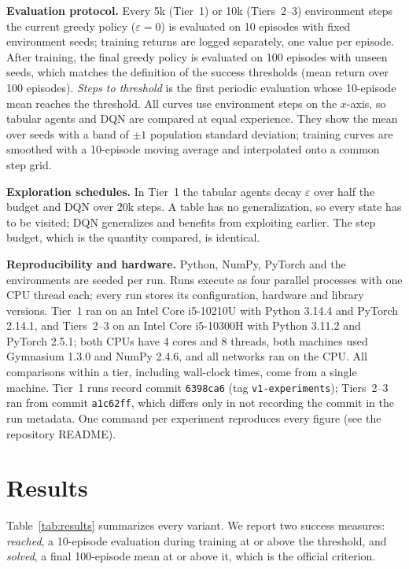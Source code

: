\documentclass[conference]{IEEEtran}
\begin{document}
\textbf{Evaluation protocol.} Every 5k (Tier~1) or 10k (Tiers~2--3) environment steps the
current greedy policy ($\varepsilon=0$) is evaluated on 10 episodes with fixed environment
seeds; training returns are logged separately, one value per episode. After training, the
final greedy policy is evaluated on 100 episodes with unseen seeds, which matches the
definition of the success thresholds (mean return over 100 episodes). \emph{Steps to
threshold} is the first periodic evaluation whose 10-episode mean reaches the threshold.
All curves use environment steps on the $x$-axis, so tabular agents and DQN are compared
at equal experience. They show the mean over seeds with a band of $\pm1$ population standard
deviation; training curves are smoothed with a 10-episode moving average and interpolated
onto a common step grid.

\textbf{Exploration schedules.} In Tier~1 the tabular agents decay $\varepsilon$ over half
the budget and DQN over 20k steps. A table has no generalization, so every state has to be
visited; DQN generalizes and benefits from exploiting earlier. The step budget, which is
the quantity compared, is identical.

\textbf{Reproducibility and hardware.} Python, NumPy, PyTorch and the environments are
seeded per run. Runs execute as four parallel processes with one CPU thread each; every run
stores its configuration, hardware and library versions. Tier~1 ran on an Intel Core
i5-10210U with Python 3.14.4 and PyTorch 2.14.1, and Tiers~2--3 on an Intel Core i5-10300H
with Python 3.11.2 and PyTorch 2.5.1; both CPUs have 4 cores and 8 threads, both machines
used Gymnasium 1.3.0 and NumPy 2.4.6, and all networks ran on the CPU. All comparisons
within a tier, including wall-clock times, come from a single machine. Tier~1 runs record
commit \texttt{6398ca6} (tag \texttt{v1-experiments}); Tiers~2--3 ran from commit
\texttt{a1c62ff}, which differs only in not recording the commit in the run metadata. One
command per experiment reproduces every figure (see the repository README).

\section{Results}\label{sec:results}

Table~\ref{tab:results} summarizes every variant. We report two success measures:
\emph{reached}, a 10-episode evaluation during training at or above the threshold, and
\emph{solved}, a final 100-episode mean at or above it, which is the official criterion.
\end{document}
